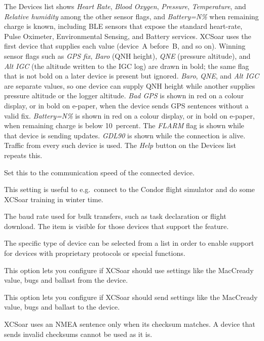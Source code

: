 \begin{description}
  The Devices list shows {\it Heart Rate}, {\it Blood Oxygen},
  {\it Pressure}, {\it Temperature}, and {\it Relative humidity}
  among the other sensor flags, and {\it Battery=N\%} when remaining
  charge is known, including BLE sensors that expose the standard
  heart-rate, Pulse Oximeter, Environmental Sensing, and Battery
  services.
  XCSoar uses the first device that supplies each value (device~A
  before~B, and so on).  Winning sensor flags such as {\it GPS fix},
  {\it Baro} (QNH height), {\it QNE} (pressure altitude), and
  {\it Alt IGC} (the altitude written to the IGC log) are
  drawn in bold; the same flag that is not bold on a later device is
  present but ignored.  {\it Baro}, {\it QNE}, and {\it Alt IGC} are
  separate values, so one device can supply QNH height while another
  supplies pressure altitude or the logger altitude.
  {\it Bad GPS} is shown in red on a colour display, or in bold on
  e-paper, when the device sends GPS sentences without a valid fix.
  {\it Battery=N\%} is shown in red on a colour display, or in bold
  on e-paper, when remaining charge is below 10~percent.
  The {\it FLARM} flag is shown while that device is sending
  updates.
  {\it GDL90} is shown while the connection is alive.
  Traffic from every such device is used.
  The {\it Help} button on the Devices list repeats this.
\item[Baudrate]  Set this to the communication speed of the connected device.
\item[TCP Port]  This setting is useful to e.g.\ connect to the Condor flight
  simulator and do some XCSoar training in winter time.
\item[Bulk baud rate]  The baud rate used for bulk transfers, such 
  as task declaration or flight download. The item is visible for those 
  devices that support the feature.
\item[Driver]  The specific type of device can be selected from a list in order
  to enable support for devices with proprietary protocols or special
  functions.
\item[Sync.\ from device*]  This option lets you configure if XCSoar should use settings
  like the MacCready value, bugs and ballast from the device.
\item[Sync.\ to device*]  This option lets you configure if XCSoar should send settings
  like the MacCready value, bugs and ballast to the device.
\end{description}

XCSoar uses an NMEA sentence only when its checksum matches.  A device
that sends invalid checksums cannot be used as it is.
